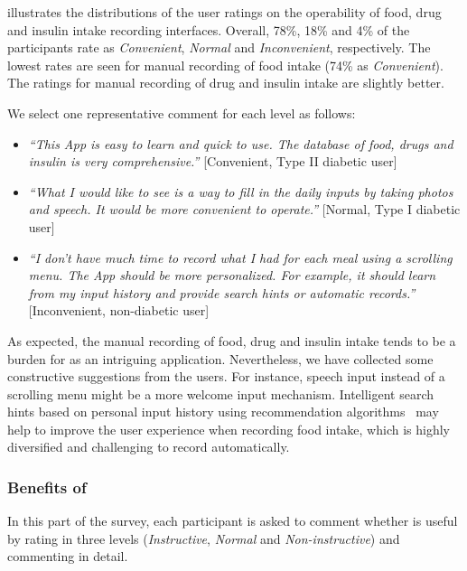 { illustrates the distributions of the user ratings on the operability of food, drug and insulin intake recording interfaces.
Overall, 78\%, 18\% and 4\% of the participants rate \sysname as \textit{Convenient}, \textit{Normal} and \textit{Inconvenient}, respectively.
The lowest rates are seen for manual recording of food intake (74\% as \textit{Convenient}).
The ratings for manual recording of drug and insulin intake are slightly better. 

We select one representative comment for each level as follows:
\begin{itemize}
  \item 
  \textit{``This App is easy to learn and quick to use. 
  The database of food, drugs and insulin is very comprehensive.''}
  [Convenient, Type II diabetic user]
  \item 
  \textit{``What I would like to see is a way to fill in the daily inputs by taking photos and speech. 
  It would be more convenient to operate.''}
  [Normal, Type I diabetic user]  
  \item 
  \textit{``I don't have much time to record what I had for each meal using a scrolling menu.
  The App should be more personalized. 
  For example, it should learn from my input history and provide search hints or automatic records.''}
  [Inconvenient, non-diabetic user]
\end{itemize}

As expected, the manual recording of food, drug and insulin intake tends to be a burden for \sysname as an intriguing application.
Nevertheless, we have collected some constructive suggestions from the users. 
For instance, speech input instead of a scrolling menu might be a more welcome input mechanism.
Intelligent search hints based on personal input history using recommendation algorithms~\cite{bib:fu2000mining} may help to improve the user experience when recording food intake, which is highly diversified and challenging to record automatically.

\subsubsection{Benefits of \sysname}
In this part of the survey, each participant is asked to comment whether \sysname is useful by rating \sysname in three levels (\textit{Instructive}, \textit{Normal} and \textit{Non-instructive}) and commenting in detail.

}
